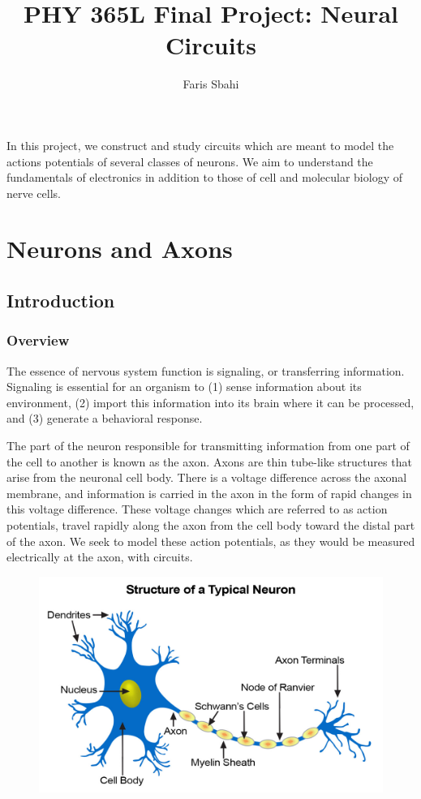 \documentclass[12]{book}
\title{PHY 365L Final Project: Neural Circuits}
\author{Faris Sbahi}
\newcommand\0{\mathbf{0}}
\newcommand\<{\langle}
\renewcommand\>{\rangle}
\begin{document}
\maketitle


In this project, we construct and study circuits which are meant to model the actions potentials of several classes of neurons. We aim to understand the fundamentals of electronics in addition to those of cell and molecular biology of nerve cells.

\chapter{Neurons and Axons}

\section{Introduction}

\subsection{Overview}

The essence of nervous system function is signaling, or transferring information. Signaling is essential for an organism to (1) sense information about its environment, (2) import this information into its brain where it can be processed, and (3) generate a behavioral response.

The part of the neuron responsible for transmitting information from one part of the cell to another is known as the axon. Axons are thin tube-like structures that arise from the neuronal cell body. There is a voltage difference across the axonal membrane, and information is carried in the axon in the form of rapid changes in this voltage difference. These voltage changes which are referred to as action potentials, travel rapidly along the axon from the cell body toward the distal part of the axon. We seek to model these action potentials, as they would be measured electrically at the axon, with circuits.

\begin{figure}[h]
\centering
\includegraphics{neuron-structure.jpg}
\end{figure}
\end{document}

